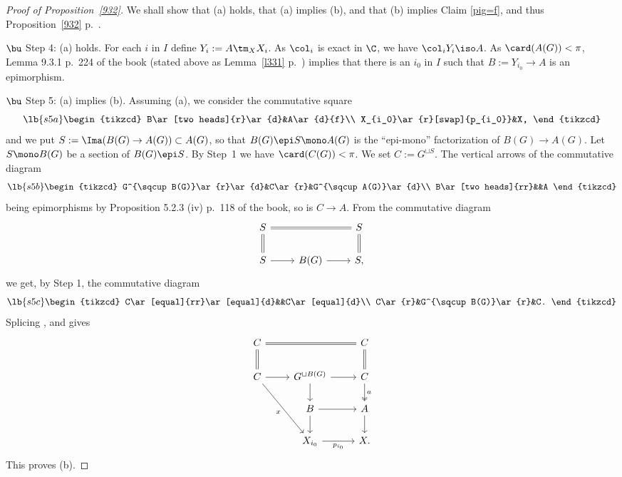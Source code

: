 \documentclass[12pt]{article}
\theoremstyle{remark}
\theoremstyle{definition}
\begin{document}
\begin{proof}[Proof of Proposition~\ref{932}]
We shall show that (a) holds, that (a) implies (b), and that (b) implies Claim \ref{pig=f}, and thus Proposition~\ref{932} p.~.%

\nn$\bu$ Step 4: (a) holds. For each $i$ in $I$ define $Y_i:=A\tm_XX_i$. As $\col_i$ is exact in $\C$, we have $\col_iY_i\iso A$. As $\card(A(G))<\pi$, Lemma 9.3.1 p.~224 of the book (stated above as Lemma~\ref{l331} p.~) implies that there is an $i_0$ in $I$ such that $B:=Y_{i_0}\to A$ is an epimorphism.

\nn$\bu$ Step 5: (a) implies (b). Assuming (a), we consider the commutative square 
\begin{equation}\lb{s5a}
\begin{tikzcd}
B\ar[two heads]{r}\ar{d}&A\ar{d}{f}\\ 
X_{i_0}\ar{r}[swap]{p_{i_0}}&X,
\end{tikzcd}
\end{equation} 
and we put $S:=\Ima(B(G)\to A(G))\subset A(G)$, so that $B(G)\epi S\mono A(G)$ is the ``epi-mono'' factorization of $B(G)\to A(G)$. Let $S\mono B(G)$ be a section of $B(G)\epi S$. By Step~1 we have $\card(C(G))<\pi$. We set $C:=G^{\sqcup S}$. %
The vertical arrows of the commutative diagram 
\begin{equation}\lb{s5b}
\begin{tikzcd}
G^{\sqcup B(G)}\ar{r}\ar{d}&C\ar{r}&G^{\sqcup A(G)}\ar{d}\\ 
B\ar[two heads]{rr}&&A
\end{tikzcd}
\end{equation} 
being epimorphisms by Proposition 5.2.3 (iv) p.~118 of the book, so is $C\to A$. From the commutative diagram 
$$
\begin{tikzcd}
S\ar[equal]{rr}\ar[equal]{d}&&S\ar[equal]{d}\\ 
S\ar{r}&B(G)\ar{r}&S,
\end{tikzcd}
$$ 
we get, by Step 1, the commutative diagram 
\begin{equation}\lb{s5c}
\begin{tikzcd}
C\ar[equal]{rr}\ar[equal]{d}&&C\ar[equal]{d}\\ 
C\ar{r}&G^{\sqcup B(G)}\ar{r}&C.
\end{tikzcd}
\end{equation} 
Splicing ,  and  gives 
$$
\begin{tikzcd}
C\ar[equal]{rr}\ar[equal]{d}&&C\ar[equal]{d}\\ 
C\ar{r}\ar{rdd}[swap]{x}&G^{\sqcup B(G)}\ar{r}\ar{d}&C\ar[two heads]{d}{a}\\ 
{}&B\ar{r}\ar{d}&A\ar{d}\\ 
{}&X_{i_0}\ar{r}[swap]{p_{i_0}}&X.
\end{tikzcd}
$$ 
This proves (b).


\end{proof}
\end{document}
